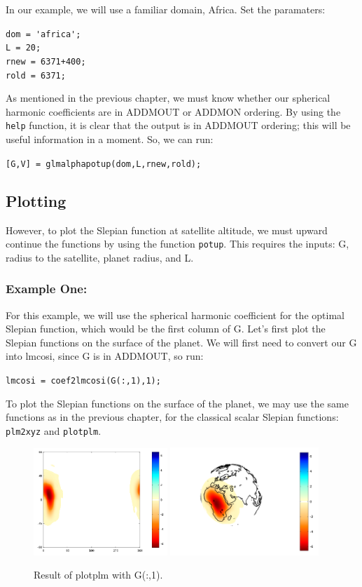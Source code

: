 \documentclass[11pt]{article}
\begin{document}
In our example, we will use a familiar domain, Africa.  Set the paramaters:
 
\verb+dom = 'africa';+  \\
\verb+L = 20;+ \\
\verb|rnew = 6371+400;|  \\
\verb+rold = 6371;+  

As mentioned in the previous chapter, we must know whether our spherical harmonic coefficients are in ADDMOUT or ADDMON ordering.  By using the \verb+help+ function, it is clear that the output is in ADDMOUT ordering; this will be useful information in a moment.  So, we can run:

\verb+[G,V] = glmalphapotup(dom,L,rnew,rold);+

\subsection{Plotting}
However, to plot the Slepian function at satellite altitude, we must upward continue the functions by using the function \verb+potup+.  This requires the inputs: G, radius to the satellite, planet radius, and L.  

\subsubsection{Example One:}
For this example, we will use the spherical harmonic coefficient for the optimal Slepian function, which would be the first column of G.  Let's first plot the Slepian functions on the surface of the planet.  We will first need to convert our G into lmcosi, since G is in ADDMOUT, so run:

\verb+lmcosi = coef2lmcosi(G(:,1),1);+

To plot the Slepian functions on the surface of the planet, we may use the same functions as in the previous chapter, for the classical scalar Slepian functions: \verb+plm2xyz+ and \verb+plotplm+. 
 
\begin{figure}
  \includegraphics[width=0.45\textwidth]{figures/G(:,1)flat.png}
  \includegraphics[width=0.5\textwidth]{figures/G(:,1).png}
  \caption{Result of plotplm with G(:,1).}
\label{G(:,1)}
\end{figure}
\end{document}
